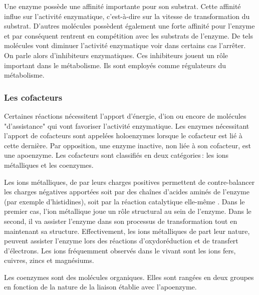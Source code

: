 \begin{refsegment}
    Une enzyme possède une affinité importante pour son substrat. Cette affinité influe sur l'activité enzymatique, c'est-à-dire sur la vitesse de transformation du substrat. D'autres molécules possèdent également une forte affinité pour l'enzyme et par conséquent rentrent en compétition avec les substrats de l'enzyme. De tels molécules vont diminuer l'activité enzymatique voir dans certains cas l'arrêter. On parle alors d'inhibiteurs enzymatiques. Ces inhibiteurs jouent un rôle important dans le métabolisme. Ils sont employés comme régulateurs du métabolisme. 
    

    \subsubsection{Les cofacteurs}
    Certaines réactions nécessitent l'apport d'énergie, d'ion ou encore de molécules "d'assistance" qui vont favoriser l'activité enzymatique. Les enzymes nécessitant l'apport de cofacteurs sont appelées holoenzymes lorsque le cofacteur est lié à cette dernière. Par opposition, une enzyme inactive, non liée à son cofacteur, est une apoenzyme. Les cofacteurs sont classifiés en deux catégories : les ions métalliques et les coenzymes.
    
    Les ions métalliques, de par leurs charges positives permettent de contre-balancer les charges négatives apportées soit par des chaînes d'acides aminés de l'enzyme (par exemple d'histidines), soit par la réaction catalytique elle-même \cite{christianson1991structural}. Dans le premier cas, l'ion métallique joue un rôle structural au sein de l'enzyme. Dans le second, il va assister l'enzyme dans son processus de transformation tout en maintenant sa structure. Effectivement, les ions métalliques de part leur nature, peuvent assister l'enzyme lors des réactions d'oxydoréduction et de transfert d'électrons. Les ions fréquemment observés dans le vivant sont les ions fers, cuivres, zincs et magnésiums.
    
    Les coenzymes sont des molécules organiques. Elles sont rangées en deux groupes en fonction de la nature de la liaison établie avec l'apoenzyme.
    

\end{refsegment}
